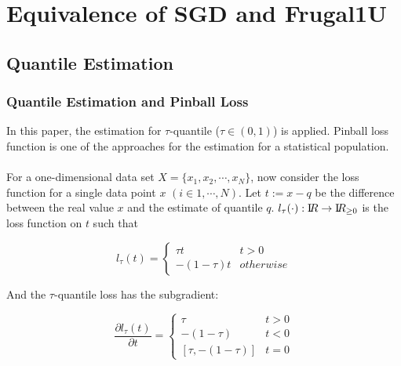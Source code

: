 \chapter{Equivalence of SGD and Frugal1U}
\label{ch: algo_equal}
            
\section{Quantile Estimation}



\subsection{Quantile Estimation and Pinball Loss}
In this paper, the estimation for $\tau$-quantile 
($\tau \in (0,1)$)
is applied.
Pinball loss function is one of the approaches for the estimation for a statistical population.
\\\\
For a one-dimensional data set $X = \{x_1, x_2, \cdots, x_N\}$, 
now consider the loss function for a single data point $x$ $(i \in {1, \cdots, N})$.
Let $t := x - q$ be the difference between the real value $x$ and the estimate of quantile $q$.
$l_{\tau}(\cdot): \mathrm I\!R \to \mathrm I\!R_{\geq 0}$ is the loss function on $t$ such that

\begin{equation}
    l_\tau(t)= 
        \begin{cases}
            \tau t & t > 0\\
            -(1-\tau) t & otherwise
        \end{cases}
\end{equation}


And the $\tau$-quantile loss has the {\color{red} subgradient}:

\begin{equation}
    \frac {\partial l_\tau(t)}{\partial t}= 
        \begin{cases}
            \tau                & t > 0\\
            -(1-\tau)           & t < 0\\
            [\tau, -(1 - \tau)] & t = 0
        \end{cases}
\end{equation}




